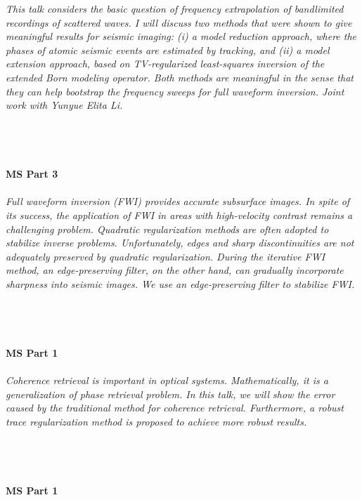 \begin{multicols}{2}
    \textit{This talk considers the basic question of frequency extrapolation of bandlimited recordings of scattered waves. I will discuss two methods that were shown to give meaningful results for seismic imaging: (i) a model reduction approach, where the phases of atomic seismic events are estimated by tracking, and (ii) a model extension approach, based on TV-regularized least-squares inversion of the extended Born modeling operator. Both methods are meaningful in the sense that they can help bootstrap the frequency sweeps for full waveform inversion. Joint work with Yunyue Elita Li.}\\
\\ 
    \\
    \\\\
    \noindent\textbf{MS Part 3}\\
\\  
    \textit{Full waveform inversion (FWI) provides accurate subsurface images. In spite of its success, the application of FWI in areas with high-velocity contrast remains a challenging problem.  Quadratic regularization methods are often adopted to stabilize inverse problems. Unfortunately, edges and sharp discontinuities are not adequately preserved by quadratic regularization. During the iterative FWI method, an edge-preserving filter, on the other hand, can gradually incorporate sharpness into seismic images. We use an edge-preserving filter to stabilize FWI.}\\
\\ 
    \\
    \\\\
    \noindent\textbf{MS Part 1}\\
\\  
    \textit{Coherence retrieval is important in optical systems. Mathematically, it is a generalization of phase retrieval problem. In this talk, we will show the error caused by the traditional method for coherence retrieval. Furthermore, a robust trace regularization method is proposed to achieve more robust results.}\\
\\ 
    \\
    \\\\
    \noindent\textbf{MS Part 1}\\

\end{multicols}
